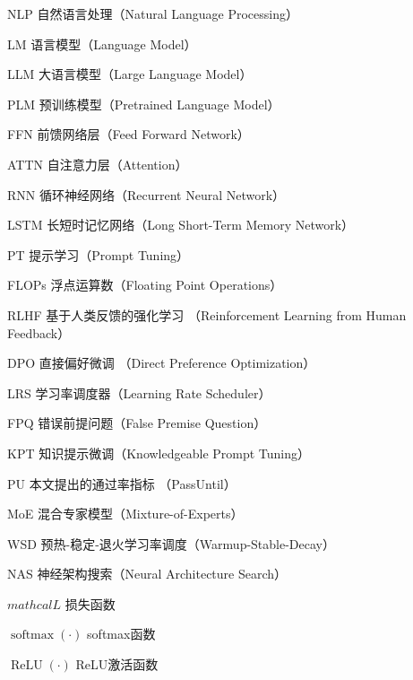 
\begin{denotation}[3cm]
  \item[NLP] 自然语言处理（Natural Language Processing）
  \item[LM] 语言模型（Language Model）
  \item[LLM] 大语言模型（Large Language Model）
  \item[PLM] 预训练模型（Pretrained Language Model）
  \item[FFN] 前馈网络层（Feed Forward Network）
  \item[ATTN] 自注意力层（Attention）
  \item[RNN] 循环神经网络（Recurrent Neural Network）
  \item[LSTM] 长短时记忆网络（Long Short-Term Memory Network） 
  \item[PT] 提示学习（Prompt Tuning）
  \item[FLOPs] 浮点运算数（Floating Point Operations）
  \item[RLHF] 基于人类反馈的强化学习 （Reinforcement Learning from Human Feedback）
  \item[DPO] 直接偏好微调 （Direct Preference Optimization）
  \item[LRS] 学习率调度器（Learning Rate Scheduler）
  \item[FPQ] 错误前提问题（False Premise Question）
  \item[KPT] 知识提示微调（Knowledgeable Prompt Tuning）
  \item[PU] 本文提出的通过率指标 （PassUntil）
  \item[MoE] 混合专家模型（Mixture-of-Experts）
  \item[WSD] 预热-稳定-退火学习率调度（Warmup-Stable-Decay）
  \item[NAS] 神经架构搜索（Neural Architecture Search） 
  \item[$mathcal{L}$] 损失函数 
  \item[$\operatorname{softmax}(\cdot)$] softmax函数
  \item[$\operatorname{ReLU}(\cdot)$] ReLU激活函数
\end{denotation}





